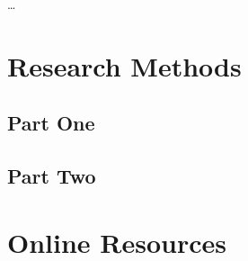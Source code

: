 \documentclass[acmtog]{acmart}
\begin{document}
\begin{acks}
	\ldots
\end{acks}





\appendix

\section{Research Methods}

\subsection{Part One}



\subsection{Part Two}



\section{Online Resources}
\end{document}
